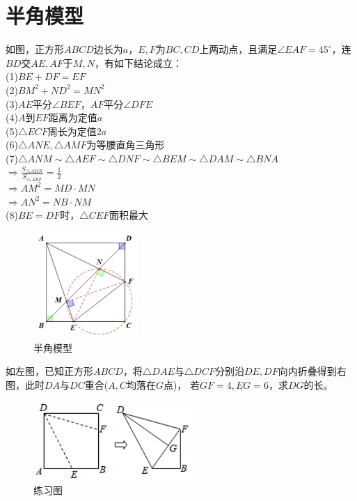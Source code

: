\documentclass{ecnuthesis}
\begin{document}
\clearpage
\section{半角模型}
\begin{model}
    如图，正方形$ABCD$边长为$a$，$E,F$为$BC,CD$上两动点，且满足$\angle EAF=45^\circ$，连$BD$交$AE,AF$于$M,N$，有如下结论成立：\\
    (1)$BE+DF=EF$ \\
    (2)$BM^2+ND^2=MN^2$ \\
    (3)$AE$平分$\angle BEF$，$AF$平分$\angle DFE$ \\
    (4)$A$到$EF$距离为定值$a$ \\
    (5)$\triangle ECF$周长为定值$2a$ \\
    (6)$\triangle ANE,\triangle AMF$为等腰直角三角形 \\
    (7)$\triangle ANM \sim \triangle AEF \sim \triangle DNF \sim \triangle BEM \sim \triangle DAM \sim \triangle BNA$ \\
    $\Rightarrow \frac{S_{\triangle AMN}}{S_{\triangle AEF}}=\frac{1}{2}$ \\
    $\Rightarrow AM^2=MD·MN$ \\
    $\Rightarrow AN^2=NB·NM$ \\
    (8)$BE=DF$时，$\triangle CEF$面积最大
\end{model}
\begin{figure}[H]
\centering
\includegraphics[width=4cm]{picture/6104.png}
\caption{半角模型}
\end{figure}
\begin{problem}
    如左图，已知正方形$ABCD$，将$\triangle DAE$与$\triangle DCF$分别沿$DE,DF$向内折叠得到右图，此时$DA$与$DC$重合($A,C$均落在$G$点)，
    若$GF=4,EG=6$，求$DG$的长。
\end{problem}
\begin{figure}[H]
\centering
\includegraphics[width=6cm]{picture/6105.png}
\caption{练习图}
\end{figure}
\end{document}
